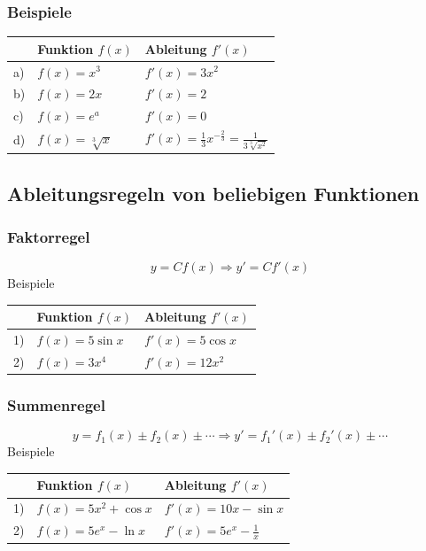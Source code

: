 \documentclass[11pt]{amsart}
\theoremstyle{remark}
\begin{document}
\subsubsection*{Beispiele}
\begin{table}[h]
\begin{center}
\begin{tabular}[t]{l|l|l}
 & Funktion $f(x)$ & Ableitung $f'(x)$ \\
\hline
a) & $f(x)=x^3$ & $f'(x)=3x^2$ \\
b) & $f(x)=2x$ & $f'(x)=2$ \\
c) & $f(x)=e^a$ & $f'(x)=0$ \\
d) &  $f(x)=\sqrt [3]{x}$ & $f'(x)=\frac 13 x^{-\frac 23} = \frac 1{3\sqrt [3]{x^2}}$ \\
\end{tabular}
\end{center}
\label{default}
\end{table}
\subsection{Ableitungsregeln von beliebigen Funktionen}
\subsubsection{Faktorregel}
\begin{equation*}
y = Cf(x)\Rightarrow y' = Cf'(x)
\end{equation*}
Beispiele
\begin{table}[h]
\begin{center}
\begin{tabular}[t]{l|l|l}
 & Funktion $f(x)$ & Ableitung $f'(x)$ \\
\hline
1) & $f(x)=5\sin {x}$ & $f'(x)=5\cos {x}$ \\
2) & $f(x)=3x^4$ & $f'(x)=12x^2$ \\
\end{tabular}
\end{center}
\label{default}
\end{table}
\subsubsection{Summenregel}
\begin{equation*}
y = f_1(x) \pm f_2(x) \pm \dotsb \Rightarrow y' = f_1'(x) \pm f_2'(x) \pm \dotsb
\end{equation*}
Beispiele
\begin{table}[h]
\begin{center}
\begin{tabular}[t]{l|l|l}
 & Funktion $f(x)$ & Ableitung $f'(x)$ \\
\hline
1) & $f(x)=5x^2 + \cos {x}$ & $f'(x)=10x -\sin {x}$ \\
2) & $f(x)=5e^x -\ln x$ & $f'(x)=5e^x - \frac 1x$ \\
\end{tabular}
\end{center}
\label{default}
\end{table}
\end{document}

